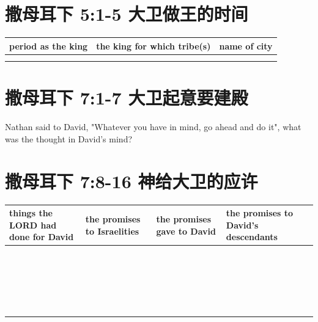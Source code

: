 \section{撒母耳下 5:1-5 大卫做王的时间}
\begin{table}[H]\centering
\begin{tabular}{p{3.75cm}|p{5.75cm}|p{3.75cm}}\hline\hline
period as the king&the king for which tribe(s) & name of city\\\hline
&&\\\hline
&&\\\hline
\end{tabular}
\end{table}

\section{撒母耳下 7:1-7 大卫起意要建殿}
Nathan said to David, "Whatever you have in mind, go ahead and do it", what was the thought in David's mind?

\section{撒母耳下 7:8-16 神给大卫的应许}

\begin{table}[H]\centering
\begin{tabular}{p{3.75cm}|p{3cm}|p{2.75cm}|p{5.25cm}}\hline\hline
 things the LORD had done for David&the promises to Israelities&the promises gave to David&the promises to David's descendants\\\hline
 &&&\\
  &&&\\
 &&&\\
 &&&\\
 &&&\\
 &&&\\
 &&&\\
 &&&\\
 &&&\\
 &&&\\
 &&&\\
 &&&\\
 &&&\\
 &&&\\
 &&&\\
 &&&\\
 &&&\\
 &&&\\
 &&&\\
 &&&\\
 &&&\\
 &&&\\
\end{tabular}
\end{table}









